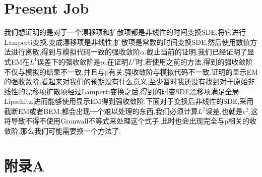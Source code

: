 \documentclass[12pt,final]{article}
\numberwithin{equation}{section}
\numberwithin{figure}{section}
\numberwithin{table}{section}
\theoremstyle{plain}
\theoremstyle{definition}
\theoremstyle{remark}
\begin{document}
\section{Present Job}
我们想证明的是对于一个漂移项和扩散项都是非线性的时间变换SDE,将它进行Lamperti变换,变成漂移项是非线性,扩散项是常数的时间变换SDE,然后使用数值方法进行离散,得到与模拟代码一致的强收敛阶$\alpha$.截止当前的证明,我们已经证明了显式EM在$L^1$误差下的强收敛阶是$\alpha$,在证明$L^p$时,若使用之前的方法,得到的强收敛阶不仅与模拟的结果不一致,并且与p有关,强收敛阶与模拟代码不一致.证明的显示EM的强收敛阶,看起来对我们的预期没有什么意义,至少暂时我还没有找到对于原始非线性的漂移项扩散项经过Lamperti变换之后,得到的时变SDE漂移项满足全局Lipschitz,进而能够使用显示EM得到强收敛阶.下面对于变换后非线性的SDE,采用截断EM或者BEM,都会出现一个难以处理的东西,我们必须计算$L^2$误差,也就是$e^2$,这将导致不得不使用Gronwall不等式来处理这个式子,此时也会出现完全与p相关的收敛阶,那么我们可能需要换一个方法了.
\appendix
\renewcommand{\appendixname}{附录} %

\section{附录A}\label{appendix A}





\end{document}
